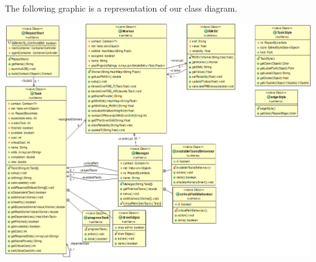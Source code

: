 \documentclass[paper=a4, fontsize=11pt]{scrartcl} %
\numberwithin{equation}{section} %
\numberwithin{figure}{section} %
\numberwithin{table}{section} %
\begin{document}
The following graphic is a representation of our class diagram.
\begin{center}
	\includegraphics[scale=0.4]{Model.png}
\end{center}
\end{document}
